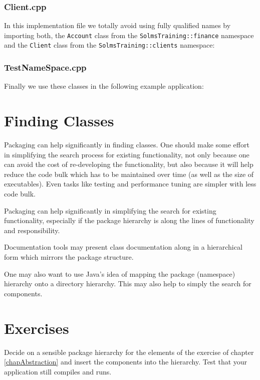 \noindent{\small }


\subsubsection{Client.cpp}

In this implementation file we totally avoid using fully qualified
names by importing both, the \verb+Account+ class from the 
\verb+SolmsTraining::finance+ namespace and the \verb+Client+ class
from the \verb+SolmsTraining::clients+ namespace:

\noindent{\small }


\subsubsection{TestNameSpace.cpp}

Finally we use these classes in the following example application:

\noindent{\small }


\section{Finding Classes}

Packaging can help significantly in finding classes. One should make 
some effort in simplifying the search process for existing functionality,
not only because one can avoid the cost of re-developing the functionality,
but also because it will help reduce the code bulk which has to be 
maintained over time (as well as the size of executables).
Even tasks like testing and performance tuning are simpler with
less code bulk.

Packaging can help significantly in simplifying the search for existing
functionality, especially if the package hierarchy is along the lines
of functionality and responsibility.

Documentation tools may present class documentation along in
a hierarchical form which mirrors the package structure.

One may also want to use Java's idea of mapping the package 
(namespace) hierarchy onto a directory hierarchy. This may
also help to simply the search for components.


\section{Exercises}

Decide on a sensible package hierarchy for the elements of the exercise
of chapter \ref{chapAbstraction} and insert the components into the
hierarchy. Test that your application still compiles and runs.
